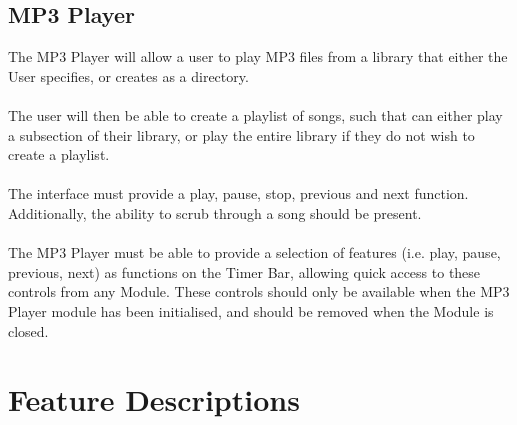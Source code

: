 \documentclass[a4paper, 12pt]{article}
\begin{document}
\newpage
\subsection{MP3 Player}
The MP3 Player will allow a user to play MP3 files from a library that either the User specifies, or creates as a directory.\\\\
The user will then be able to create a playlist of songs, such that can either play a subsection of their library, or play the entire library if they do not wish to create a playlist.\\\\
The interface must provide a play, pause, stop, previous and next function. Additionally, the ability to scrub through a song should be present.\\\\
The MP3 Player must be able to provide a selection of features (i.e. play, pause, previous, next) as functions on the Timer Bar, allowing quick access to these controls from any Module. These controls should only be available when the MP3 Player module has been initialised, and should be removed when the Module is closed.
\newpage
\section{Feature Descriptions}
\end{document}

